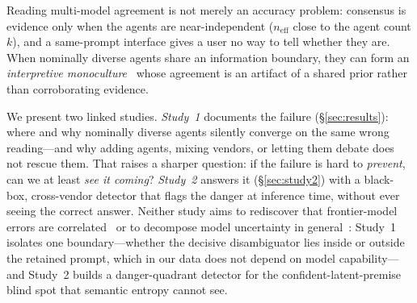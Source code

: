 \documentclass[acmsmall,screen,nonacm]{acmart}
\newcommand{\neff}{\ensuremath{n_{\mathrm{eff}}}}
\begin{document}
Reading multi-model agreement is not merely
an accuracy problem: consensus is evidence only when the agents are near-independent ($\neff$ close to the
agent count $k$), and a same-prompt interface gives a user no way to tell whether they are. When nominally diverse agents share an information boundary,
they can form an \emph{interpretive monoculture}~\cite{kleinberg2021monoculture} whose agreement is an
artifact of a shared prior rather than corroborating evidence.

We present two linked studies. \emph{Study~1} documents the failure (\S\ref{sec:results}): where and why
nominally diverse agents silently converge on the same wrong reading---and why adding agents, mixing vendors,
or letting them debate does not rescue them. That raises a sharper question: if the failure is hard to
\emph{prevent}, can we at least \emph{see it coming}? \emph{Study~2} answers it (\S\ref{sec:study2}) with a
black-box, cross-vendor detector that flags the danger at inference time, without ever seeing the correct
answer. Neither study aims to rediscover that frontier-model errors are
correlated~\cite{kim2025correlated} or to decompose model uncertainty in general~\cite{hou2024decomposing}:
Study~1 isolates one boundary---whether the decisive disambiguator lies inside or outside the retained
prompt, which in our data does not depend on model capability---and Study~2 builds a danger-quadrant
detector for the confident-latent-premise blind spot that semantic entropy cannot see.
\end{document}
